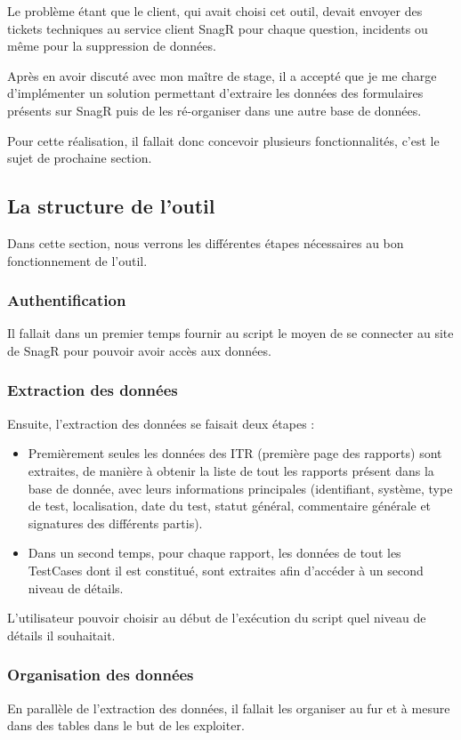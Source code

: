 Le problème étant que le client, qui avait choisi cet outil, devait envoyer des tickets techniques au service client \gls{SnagR} pour chaque question, incidents ou même pour la suppression de données.

Après en avoir discuté avec mon maître de stage, il a accepté que je me charge d'implémenter un solution permettant d'extraire les données des formulaires présents sur \gls{SnagR} puis de les ré-organiser dans une autre base de données.

Pour cette réalisation, il fallait donc concevoir plusieurs fonctionnalités, c'est le sujet de prochaine section.

\subsection{La structure de l'outil}

Dans cette section, nous verrons les différentes étapes nécessaires au bon fonctionnement de l'outil.

\subsubsection{Authentification} 
Il fallait dans un premier temps fournir au script le moyen de se connecter au site de \gls{SnagR} pour pouvoir avoir accès aux données.
\subsubsection{Extraction des données} 
Ensuite, l'extraction des données se faisait deux étapes : 
\begin{itemize}
\item Premièrement seules les données des ITR (première page des rapports) sont extraites, de manière à obtenir la liste de tout les rapports présent dans la base de donnée, avec leurs informations principales (identifiant, système, type de test, localisation, date du test, statut général, commentaire générale et signatures des différents partis).
\item Dans un second temps, pour chaque rapport, les données de tout les \gls{TestCases} dont il est constitué, sont extraites afin d'accéder à un second niveau de détails.
\end{itemize}

L'utilisateur pouvoir choisir au début de l'exécution du script quel niveau de détails il souhaitait.
\subsubsection{Organisation des données}
En parallèle de l'extraction des données, il fallait les organiser au fur et à mesure dans des tables dans le but de les exploiter.
